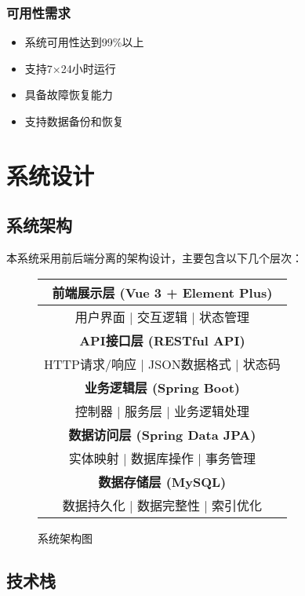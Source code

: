 \documentclass[12pt,a4paper]{article}
\begin{document}
\subsubsection{可用性需求}
\begin{itemize}
    \item 系统可用性达到99\%以上
    \item 支持7×24小时运行
    \item 具备故障恢复能力
    \item 支持数据备份和恢复
\end{itemize}

\section{系统设计}

\subsection{系统架构}

本系统采用前后端分离的架构设计，主要包含以下几个层次：

\begin{figure}[H]
\centering
\begin{tabular}{|c|}
\hline
\textbf{前端展示层 (Vue 3 + Element Plus)} \\
\hline
用户界面 | 交互逻辑 | 状态管理 \\
\hline
\hline
\textbf{API接口层 (RESTful API)} \\
\hline
HTTP请求/响应 | JSON数据格式 | 状态码 \\
\hline
\hline
\textbf{业务逻辑层 (Spring Boot)} \\
\hline
控制器 | 服务层 | 业务逻辑处理 \\
\hline
\hline
\textbf{数据访问层 (Spring Data JPA)} \\
\hline
实体映射 | 数据库操作 | 事务管理 \\
\hline
\hline
\textbf{数据存储层 (MySQL)} \\
\hline
数据持久化 | 数据完整性 | 索引优化 \\
\hline
\end{tabular}
\caption{系统架构图}
\end{figure}

\subsection{技术栈}
\end{document}
